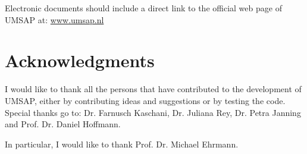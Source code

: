 \newpage

Electronic documents should include a direct link to the official web page of
UMSAP at: \href{https://www.umsap.nl}{www.umsap.nl}

\section{Acknowledgments}

I would like to thank all the persons that have contributed to the development
of UMSAP, either by contributing ideas and suggestions or by testing the code.
Special thanks go to: Dr. Farnusch Kaschani, Dr. Juliana Rey, Dr. Petra Janning
and Prof. Dr. Daniel Hoffmann.

In particular, I would like to thank Prof. Dr. Michael Ehrmann.

